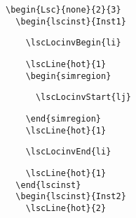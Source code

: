 \documentclass{article}
\begin{document}
\begin{center}%
\begin{minipage}{0.5\textwidth}
\end{minipage}
\hfill
\begin{minipage}{0.45\textwidth}%
\small%
{\gray\begin{verbatim}
\begin{Lsc}{none}{2}{3}
  \begin{lscinst}{Inst1}
\end{verbatim}}%
\verbunskip%
{\begin{verbatim}
    \lscLocinvBegin{li}
\end{verbatim}}%
\verbunskip%
{\gray\begin{verbatim}
    \lscLine{hot}{1}
    \begin{simregion}
\end{verbatim}}%
\verbunskip%
{\begin{verbatim}
      \lscLocinvStart{lj}
\end{verbatim}}%
\verbunskip%
{\gray\begin{verbatim}
    \end{simregion}
    \lscLine{hot}{1}
\end{verbatim}}%
\verbunskip%
{\begin{verbatim}
    \lscLocinvEnd{li}
\end{verbatim}}%
\verbunskip%
{\gray\begin{verbatim}
    \lscLine{hot}{1}
  \end{lscinst}
  \begin{lscinst}{Inst2}
    \lscLine{hot}{2}
\end{verbatim}}%
\verbunskip%
{\begin{verbatim}

\end{verbatim}}
\end{minipage}
\end{center}
\end{document}
